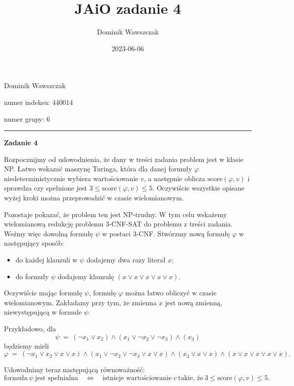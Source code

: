 \documentclass[12pt]{article}
\title{JAiO zadanie 4}
\author{Dominik Wawszczak}
\date{2023-06-06}
\begin{document}
	\setlength{\parindent}{0 cm}
	
	Dominik Wawszczak
	
	numer indeksu: 440014
	
	numer grupy: 6
	
	\bigskip
	\hrule
	\bigskip
	
	\textbf{Zadanie 4}
	
	\medskip
	
	Rozpocznijmy od udowodnienia, że dany w treści zadania problem jest w klasie
	NP. Łatwo wskazać maszynę Turinga, która dla danej formuły \(\varphi\)
	niedeterministycznie wybiera wartościowanie \(v\), a następnie oblicza
	\(\text{score} \left( \varphi, v \right)\) i sprawdza czy spełnione jest \(3
	\leqslant \text{score} \left( \varphi, v \right) \leqslant 5\). Oczywiście
	wszystkie opisane wyżej kroki można przeprowadzić w czasie wielomianowym.
	
	\medskip
	
	Pozostaje pokazać, że problem ten jest NP-trudny. W tym celu wskażemy
	wielomianową redukcję problemu 3-CNF-SAT do problemu z treści zadania. Weźmy
	więc dowolną formułę \(\psi\) w postaci 3-CNF. Stwórzmy nową formułę
	\(\varphi\) w następujący sposób:
	\begin{itemize}
		\item do każdej klauzuli w \(\psi\) dodajemy dwa razy literał \(x\);
		\item do formuły \(\psi\) dodajemy klauzulę \(\left( x \vee x \vee x
		      \vee x \vee x \right)\).
	\end{itemize}
	Oczywiście mając formułę \(\psi\), formułę \(\varphi\) można łatwo obliczyć
	w czasie wielomianowym. Zakładamy przy tym, że zmienna \(x\) jest nową
	zmienną, niewystępującą w formule \(\psi\).
	
	\medskip
	
	Przykładowo, dla
	\[ \psi \ = \ \left( \neg x_{1} \vee x_{2} \right) \wedge \left( x_{1} \vee
	\neg x_{2} \vee \neg x_{3} \right) \wedge \left( x_{3} \right) \]
	będziemy mieli
	\[ \varphi \ = \ \left( \neg x_{1} \vee x_{2} \vee x \vee x \right) \wedge
	\left( x_{1} \vee \neg x_{2} \vee \neg x_{3} \vee x \vee x \right) \wedge
	\left( x_{3} \vee x \vee x \right) \wedge \left( x \vee x \vee x \vee x \vee
	x \right) \text{.} \]
	
	\medskip
	
	Udowodnimy teraz następującą równoważność:
	\[ \text{formuła} \ \psi \ \text{jest spełnialna} \quad \iff \quad
	\text{istnieje wartościowanie} \ v \ \text{takie, że} \ 3 \leqslant
	\text{score} \left( \varphi, v \right) \leqslant 5 \text{.} \]
	
\end{document}

